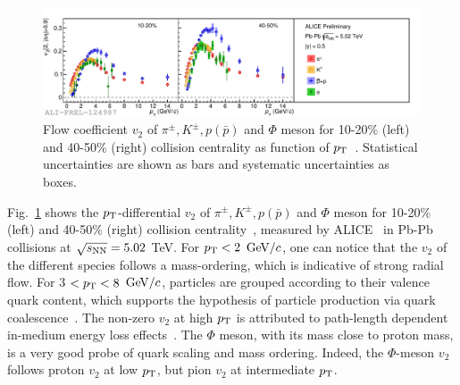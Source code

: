 \begin{figure}[!ht]
  \centering
  \includegraphics[width=15cm]{FigCap1/v2IdentifiedParticles.pdf}
  \caption{Flow coefficient $v_2$ of $\pi^{\pm}, K^{\pm}, p(\bar{p})$ and $\Phi$ meson for 10-20\% (left) and 40-50\% (right)
collision centrality as function of $p_{\rm T}$~\cite{Bertens:2017krr}. Statistical uncertainties are shown as bars and systematic uncertainties as boxes.}
  \label{fig:v2IdentifiedParticles}
\end{figure}
Fig.~\ref{fig:v2IdentifiedParticles} shows the $p_{\rm T}$-differential $v_2$ of $\pi^{\pm}, K^{\pm}, p(\bar{p})$ and $\Phi$ meson for 10-20\% (left)
and 40-50\% (right) collision centrality~\cite{Bertens:2017krr}, measured by ALICE~\cite{Bertens:2017krr} in Pb-Pb collisions at $\sqrt{s_{\rm NN}} = 5.02$ TeV.
For $p_{\rm T} < 2$ $\mathrm{GeV}/c$, one can notice that the $v_2$ of the different species follows a mass-ordering, which is indicative of strong radial flow.
For 3 $< p_{\rm T} < 8$ $\mathrm{GeV}/c$, particles are grouped according to their valence quark content, which supports the
hypothesis of particle production via quark coalescence~\cite{Molnar:2003ff}. The non-zero $v_2$ at high $p_{\rm T}$ is attributed to path-length dependent in-medium energy loss effects~\cite{Gyulassy:2000gk}. The $\Phi$ meson, with its mass close to proton mass, is a very good probe of quark scaling and mass ordering. Indeed, the $\Phi$-meson $v_2$ follows proton $v_2$ at low $p_{\rm T}$, but pion $v_2$ at intermediate $p_{\rm T}$. \\

